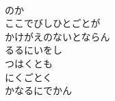 \documentclass[10pt,b5j]{tarticle} %
\begin{document}
\begin{enumerate}
\begin{minipage}[c]{\blocksize}
        \vspace{\linespace}
        \item~\\
        のか\\
        ここでびしひとごとが\\
        かけがえのないとならん\\
        るるにいをし\\
        つはくとも\\
        にくごとく\\
        かなるにでかん

    
    \end{minipage}
\end{enumerate} %
\end{document}
